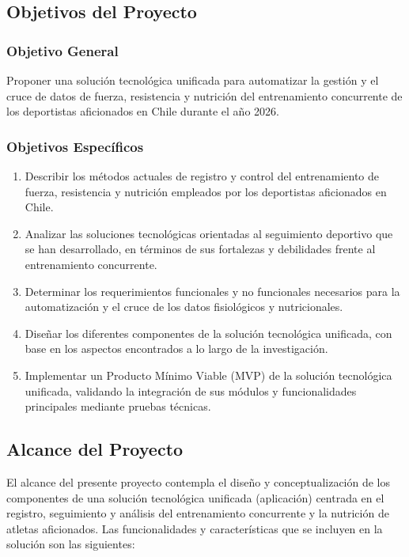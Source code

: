 \documentclass[12pt]{article}
\begin{document}
\subsection{Objetivos del Proyecto}
\subsubsection{Objetivo General}
Proponer una solución tecnológica unificada para automatizar la gestión y el cruce de datos de fuerza, resistencia y nutrición del entrenamiento concurrente de los deportistas aficionados en Chile durante el año 2026.
\subsubsection{Objetivos Específicos}

\begin{enumerate}
    \item Describir los métodos actuales de registro y control del entrenamiento de fuerza, resistencia y nutrición empleados por los deportistas aficionados en Chile.
    \item Analizar las soluciones tecnológicas orientadas al seguimiento deportivo que se han desarrollado, en términos de sus fortalezas y debilidades frente al entrenamiento concurrente.
    \item Determinar los requerimientos funcionales y no funcionales necesarios para la automatización y el cruce de los datos fisiológicos y nutricionales.
    \item Diseñar los diferentes componentes de la solución tecnológica unificada, con base en los aspectos encontrados a lo largo de la investigación.
    \item Implementar un Producto Mínimo Viable (MVP) de la solución tecnológica unificada, validando la integración de sus módulos y funcionalidades principales mediante pruebas técnicas.
\end{enumerate}
\newpage

\subsection{Alcance del Proyecto}
El alcance del presente proyecto contempla el diseño y conceptualización de los componentes de una solución tecnológica unificada (aplicación) centrada en el registro, seguimiento y análisis del entrenamiento concurrente y la nutrición de atletas aficionados. Las funcionalidades y características que se incluyen en la solución son las siguientes:
\end{document}
